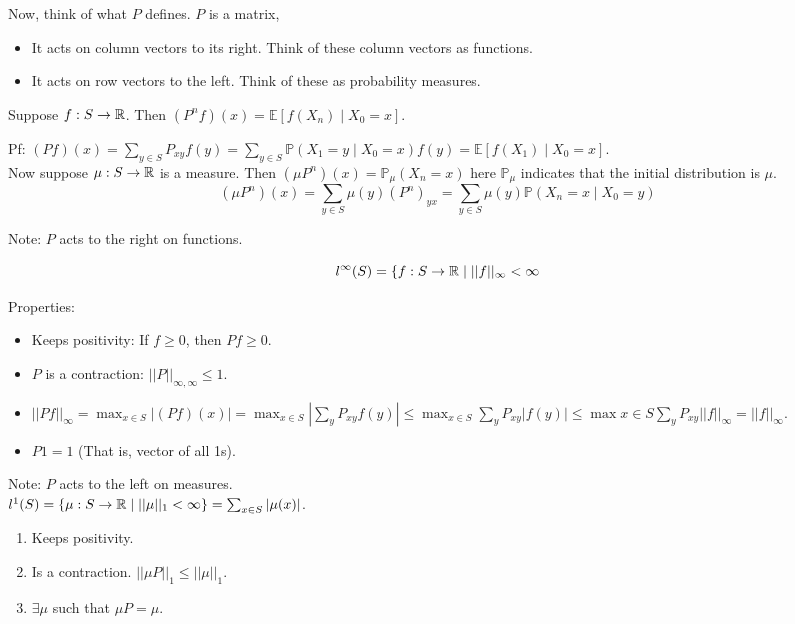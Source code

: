 \documentclass[english, 11pt]{article}
\begin{document}
Now, think of what $P$ defines. $P$ is a matrix,

\begin{itemize}
	\item It acts on column vectors to its right. Think of these column vectors as functions.
	\item It acts on row vectors to the left. Think of these as probability measures. 
\end{itemize}

Suppose $f: S \to {\mathbb{R}}$. Then $(P^n f)(x) = \mathbb{E}[f(X_n) \mid X_0 = x]$.

Pf: $(Pf)(x) = \sum_{y \in S} P_{xy} f(y) = \sum_{y \in S} \mathbb{P}(X_1 = y \mid X_0 = x)f(y) = \mathbb{E}[f(X_1) \mid X_0 = x]$.\\

Now suppose $\mu: S \to {\mathbb{R}}$ is a measure. Then $(\mu P^n)(x) = \mathbb{P}_\mu(X_n = x)$ here $\mathbb{P}_\mu$ indicates that the initial distribution is $\mu$.\\

\[(\mu P^n)(x) = \sum_{y \in S} \mu(y)(P^n)_{yx} = \sum_{y \in S} \mu(y) \mathbb{P}(X_n = x \mid X_0 = y)\]

Note: $P$ acts to the right on functions.

\[l^\infty(S) = \{f: S \to {\mathbb{R}} \mid ||f||_\infty < \infty\]

Properties:
\begin{itemize}
	\item Keeps positivity: If $f \geq 0$, then $Pf \geq 0$.\\
	\item $P$ is a contraction: $||P||_{\infty, \infty} \leq 1$.\\
	\item $||Pf||_\infty = \max_{x \in S}|(Pf)(x)| = \max_{x \in S} |\sum_y P_{xy} f(y)| \leq \max_{x \in S} \sum_y P_{xy}|f(y)| \leq \max{x \in S} \sum_y P_{xy} ||f||_\infty = ||f||_\infty$.
	\item $P 1 = 1$ (That is, vector of all 1s).
\end{itemize}

Note: $P$ acts to the left on measures.\\

$l^1(S) = \{\mu : S \to {\mathbb{R}} \mid ||\mu||_1 < \infty\} = \sum_{x \in S} |\mu(x)|$.
\begin{enumerate}
	\item Keeps positivity.
	\item Is a contraction. $||\mu P||_1 \leq ||\mu||_1$.\\
	\item $\exists \mu$ such that $\mu P = \mu$.
\end{enumerate}
\end{document}
